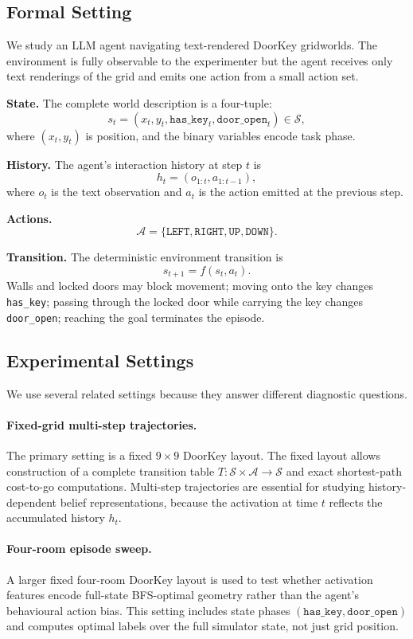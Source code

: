 \documentclass[11pt,a4paper]{article}
\newcommand{\A}{\mathcal{A}}
\newcommand{\Sspace}{\mathcal{S}}
\begin{document}
\subsection{Formal Setting}

We study an LLM agent navigating text-rendered DoorKey gridworlds. The environment is fully observable to the experimenter but the agent receives only text renderings of the grid and emits one action from a small action set.

\textbf{State.} The complete world description is a four-tuple:
\[
s_t = (x_t, y_t, \texttt{has\_key}_t, \texttt{door\_open}_t) \in \Sspace,
\]
where $(x_t,y_t)$ is position, and the binary variables encode task phase.

\textbf{History.} The agent's interaction history at step $t$ is
\[
h_t = (o_{1:t}, a_{1:t-1}),
\]
where $o_t$ is the text observation and $a_t$ is the action emitted at the previous step.

\textbf{Actions.}
\[
\A = \{\texttt{LEFT}, \texttt{RIGHT}, \texttt{UP}, \texttt{DOWN}\}.
\]

\textbf{Transition.} The deterministic environment transition is
\[
s_{t+1} = f(s_t,a_t).
\]
Walls and locked doors may block movement; moving onto the key changes \texttt{has\_key}; passing through the locked door while carrying the key changes \texttt{door\_open}; reaching the goal terminates the episode.

\subsection{Experimental Settings}

We use several related settings because they answer different diagnostic questions.

\paragraph{Fixed-grid multi-step trajectories.} The primary setting is a fixed $9\times 9$ DoorKey layout. The fixed layout allows construction of a complete transition table $T:\Sspace\times\A\rightarrow\Sspace$ and exact shortest-path cost-to-go computations. Multi-step trajectories are essential for studying history-dependent belief representations, because the activation at time $t$ reflects the accumulated history $h_t$.

\paragraph{Four-room episode sweep.} A larger fixed four-room DoorKey layout is used to test whether activation features encode full-state BFS-optimal geometry rather than the agent's behavioural action bias. This setting includes state phases $(\texttt{has\_key},\texttt{door\_open})$ and computes optimal labels over the full simulator state, not just grid position.
\end{document}
